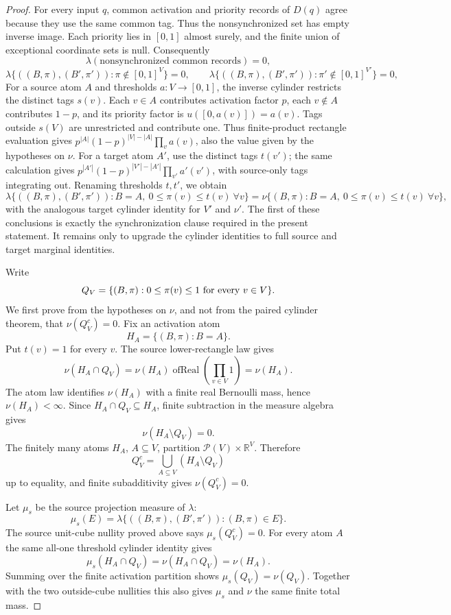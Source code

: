 \begin{proof}
For every input $q$, common activation and priority records of $D(q)$ agree
because they use the same common tag. Thus the nonsynchronized set has empty
inverse image. Each priority lies in $[0,1]$ almost surely, and the finite
union of exceptional coordinate sets is null. Consequently
\[
  \lambda(\text{nonsynchronized common records})=0,
\]
\[
  \lambda\{((B,\pi),(B',\pi')):\pi\notin[0,1]^V\}=0,\qquad
  \lambda\{((B,\pi),(B',\pi')):\pi'\notin[0,1]^{V'}\}=0,
\]
For a source atom $A$ and thresholds $a:V\to[0,1]$, the inverse cylinder
restricts the distinct tags $s(v)$. Each $v\in A$ contributes activation
factor $p$, each $v\notin A$ contributes $1-p$, and its priority factor
is $u([0,a(v)])=a(v)$. Tags outside $s(V)$ are unrestricted and contribute
one. Thus finite-product rectangle evaluation gives
$p^{|A|}(1-p)^{|V|-|A|}\prod_v a(v)$, also the value given by the
hypotheses on $\nu$. For a target atom $A'$, use the distinct tags $t(v')$;
the same calculation gives
$p^{|A'|}(1-p)^{|V'|-|A'|}\prod_{v'}a'(v')$, with source-only tags
integrating out. Renaming thresholds $t,t'$, we obtain
\[
  \lambda\{((B,\pi),(B',\pi')):B=A,\ 0\le\pi(v)\le t(v)\ \forall v\}
  =
  \nu\{(B,\pi):B=A,\ 0\le\pi(v)\le t(v)\ \forall v\},
\]
with the analogous target cylinder identity for \(V'\) and \(\nu'\).
The first of these conclusions is exactly the synchronization clause required
in the present statement.  It remains only to upgrade the cylinder identities
to full source and target marginal identities.

Write
\[
  Q_V=\{(B,\pi):0\le \pi(v)\le 1\hbox{ for every }v\in V\}.
\]
We first prove from the hypotheses on \(\nu\), and not from the paired
cylinder theorem, that \(\nu(Q_V^c)=0\).  Fix an activation atom
\[
  H_A=\{(B,\pi):B=A\}.
\]
Put \(t(v)=1\) for every \(v\).  The source lower-rectangle law gives
\[
  \nu(H_A\cap Q_V)
  =
  \nu(H_A)\operatorname{ofReal}\!\left(\prod_{v\in V}1\right)
  =
  \nu(H_A).
\]
The atom law identifies \(\nu(H_A)\) with a finite real Bernoulli mass, hence
\(\nu(H_A)<\infty\).  Since \(H_A\cap Q_V\subseteq H_A\), finite subtraction
in the measure algebra gives
\[
  \nu(H_A\setminus Q_V)=0.
\]
The finitely many atoms \(H_A\), \(A\subseteq V\), partition
\(\mathcal P(V)\times\mathbb R^V\).  Therefore
\[
  Q_V^c=\bigcup_{A\subseteq V}(H_A\setminus Q_V)
\]
up to equality, and finite subadditivity gives \(\nu(Q_V^c)=0\).

Let \(\mu_s\) be the source projection measure of \(\lambda\):
\[
  \mu_s(E)=\lambda\{((B,\pi),(B',\pi')):(B,\pi)\in E\}.
\]
The source unit-cube nullity proved above
says \(\mu_s(Q_V^c)=0\).  For every atom \(A\) the same all-one threshold
cylinder identity gives
\[
  \mu_s(H_A\cap Q_V)=\nu(H_A\cap Q_V)=\nu(H_A).
\]
Summing over the finite activation partition shows
\(\mu_s(Q_V)=\nu(Q_V)\).  Together with the two outside-cube nullities this
also gives \(\mu_s\) and \(\nu\) the same finite total mass.


\end{proof}
